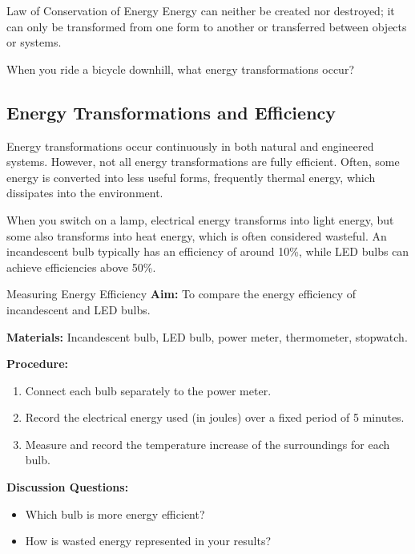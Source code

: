 \begin{marginfigure}
    \centering
    \caption{Forms of energy and their common sources (image placeholder).}
\end{marginfigure}

\begin{keyconcept}{Law of Conservation of Energy}
Energy can neither be created nor destroyed; it can only be transformed from one form to another or transferred between objects or systems.
\end{keyconcept}

\begin{stopandthink}
When you ride a bicycle downhill, what energy transformations occur?
\end{stopandthink}

\subsection{Energy Transformations and Efficiency}

Energy transformations occur continuously in both natural and engineered systems. However, not all energy transformations are fully efficient. Often, some energy is converted into less useful forms, frequently thermal energy, which dissipates into the environment.


\begin{example}
When you switch on a lamp, electrical energy transforms into light energy, but some also transforms into heat energy, which is often considered wasteful. An incandescent bulb typically has an efficiency of around 10\%, while LED bulbs can achieve efficiencies above 50\%.
\end{example}

\begin{investigation}{Measuring Energy Efficiency}
\textbf{Aim:} To compare the energy efficiency of incandescent and LED bulbs.

\textbf{Materials:} Incandescent bulb, LED bulb, power meter, thermometer, stopwatch.

\textbf{Procedure:}
\begin{enumerate}
    \item Connect each bulb separately to the power meter.
    \item Record the electrical energy used (in joules) over a fixed period of 5 minutes.
    \item Measure and record the temperature increase of the surroundings for each bulb.
\end{enumerate}

\textbf{Discussion Questions:}
\begin{itemize}
    \item Which bulb is more energy efficient?
    \item How is wasted energy represented in your results?
\end{itemize}
\end{investigation}

